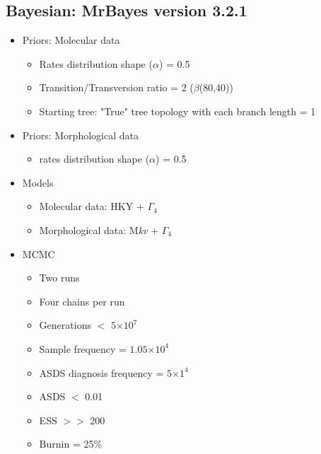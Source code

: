 \subsection*{Bayesian: MrBayes version 3.2.1 \cite{Ronquist2012mrbayes}}
\begin{itemize}
  \item Priors: Molecular data
  \begin{itemize}
    \item Rates distribution shape ($\alpha$) = 0.5
    \item Transition/Transversion ratio = 2 ($\beta$(80,40))
    \item Starting tree: "True" tree topology with each branch length = 1
  \end{itemize}
  \item Priors: Morphological data
  \begin{itemize}
    \item rates distribution shape ($\alpha$) = 0.5
  \end{itemize}
  \item Models
  \begin{itemize}
    \item Molecular data: HKY + $\Gamma_4$
    \item Morphological data: M\textit{kv} + $\Gamma_4$
  \end{itemize}
  \item MCMC
  \begin{itemize}
    \item Two runs
    \item Four chains per run
    \item Generations $<$ $5$$\times$$10^7$
    \item Sample frequency = $1.05$$\times$$10^4$
    \item ASDS diagnosis frequency = $5$$\times$$1^4$
    \item ASDS $<$ 0.01
    \item ESS $>>$ 200
    \item Burnin = 25\%
  \end{itemize}
\end{itemize}